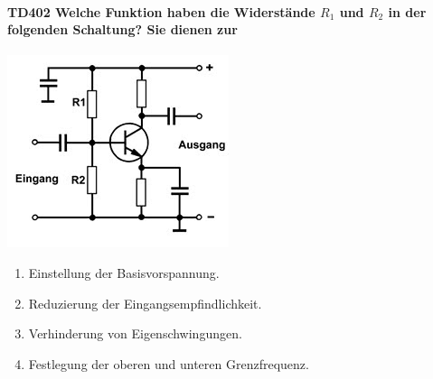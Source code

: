 \documentclass[8pt]{article}
\begin{document}
\begin{enumerate}
\begin{enumerate}[nolistsep,label=\Alph*]
\paragraph*{TD402 Welche Funktion haben die Widerstände $R_{1}$ und $R_{2}$ in der folgenden Schaltung? Sie dienen zur}
\begin{center}
	\begin{minipage}{\linewidth}
		\centering
		\includegraphics[scale=1.0]{pics/td402_a.jpg}
	\end{minipage}
\end{center}
\begin{enumerate}[nolistsep,label=\Alph*]
\item Einstellung der Basisvorspannung.
\item Reduzierung der Eingangsempfindlichkeit.
\item Verhinderung von Eigenschwingungen.
\item Festlegung der oberen und unteren Grenzfrequenz.
\end{enumerate}


\end{enumerate}
\end{enumerate}
\end{document}
